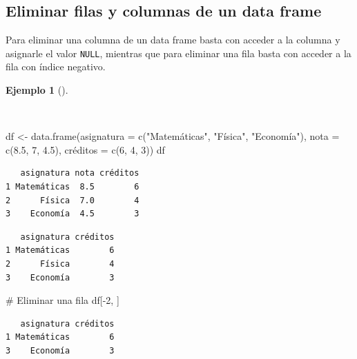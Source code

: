 \documentclass[
  a4paper,
]{scrreport}
\newenvironment{Shaded}{\begin{snugshade}}{\end{snugshade}}
\newcommand{\AttributeTok}[1]{\textcolor[rgb]{0.40,0.45,0.13}{#1}}
\newcommand{\CommentTok}[1]{\textcolor[rgb]{0.37,0.37,0.37}{#1}}
\newcommand{\ConstantTok}[1]{\textcolor[rgb]{0.56,0.35,0.01}{#1}}
\newcommand{\DecValTok}[1]{\textcolor[rgb]{0.68,0.00,0.00}{#1}}
\newcommand{\FloatTok}[1]{\textcolor[rgb]{0.68,0.00,0.00}{#1}}
\newcommand{\FunctionTok}[1]{\textcolor[rgb]{0.28,0.35,0.67}{#1}}
\newcommand{\NormalTok}[1]{\textcolor[rgb]{0.00,0.23,0.31}{#1}}
\newcommand{\OtherTok}[1]{\textcolor[rgb]{0.00,0.23,0.31}{#1}}
\newcommand{\SpecialCharTok}[1]{\textcolor[rgb]{0.37,0.37,0.37}{#1}}
\newcommand{\StringTok}[1]{\textcolor[rgb]{0.13,0.47,0.30}{#1}}
\theoremstyle{definition}
\theoremstyle{definition}
\newtheorem{example}{Ejemplo}[chapter]
\theoremstyle{remark}
\begin{document}
\hypertarget{eliminar-filas-y-columnas-de-un-data-frame}{%
\subsection{Eliminar filas y columnas de un data
frame}\label{eliminar-filas-y-columnas-de-un-data-frame}}

Para eliminar una columna de un data frame basta con acceder a la
columna y asignarle el valor \texttt{NULL}, mientras que para eliminar
una fila basta con acceder a la fila con índice negativo.

\begin{example}[]\protect\hypertarget{exm-eliminacion-filas-columnas-data-frame}{}\label{exm-eliminacion-filas-columnas-data-frame}

~

\begin{Shaded}
\begin{Highlighting}[]
\NormalTok{df }\OtherTok{\textless{}{-}} \FunctionTok{data.frame}\NormalTok{(}\AttributeTok{asignatura =} \FunctionTok{c}\NormalTok{(}\StringTok{"Matemáticas"}\NormalTok{, }\StringTok{"Física"}\NormalTok{, }\StringTok{"Economía"}\NormalTok{), }\AttributeTok{nota =} \FunctionTok{c}\NormalTok{(}\FloatTok{8.5}\NormalTok{, }\DecValTok{7}\NormalTok{, }\FloatTok{4.5}\NormalTok{), créditos }\OtherTok{=} \FunctionTok{c}\NormalTok{(}\DecValTok{6}\NormalTok{, }\DecValTok{4}\NormalTok{, }\DecValTok{3}\NormalTok{))}
\NormalTok{df}
\end{Highlighting}
\end{Shaded}

\begin{verbatim}
   asignatura nota créditos
1 Matemáticas  8.5        6
2      Física  7.0        4
3    Economía  4.5        3
\end{verbatim}

\begin{Shaded}
\end{Shaded}

\begin{verbatim}
   asignatura créditos
1 Matemáticas        6
2      Física        4
3    Economía        3
\end{verbatim}

\begin{Shaded}
\begin{Highlighting}[]
\CommentTok{\# Eliminar una fila}
\NormalTok{df[}\SpecialCharTok{{-}}\DecValTok{2}\NormalTok{, ]}
\end{Highlighting}
\end{Shaded}

\begin{verbatim}
   asignatura créditos
1 Matemáticas        6
3    Economía        3
\end{verbatim}

\end{example}
\end{document}

